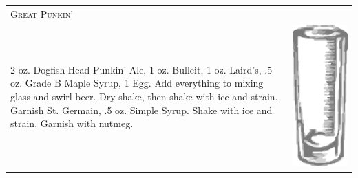 \documentclass{article}
\begin{document}
\begin{multicols}{2}
\begin{tabular}{p{2in} p{0.5in}}
\multicolumn{2}{p{3in}}{\centering\Huge\textsc{Great Punkin'}} \\ 
  \vspace{-0.1in}2 oz. Dogfish Head Punkin' Ale, 1 oz. Bulleit, 1 oz. Laird's, .5 oz. Grade B Maple Syrup, 1 Egg. Add everything to mixing glass and swirl beer. Dry-shake, then shake with ice and  strain. Garnish St. Germain, .5 oz. Simple Syrup.  Shake with ice and strain. Garnish with nutmeg. &
  \vspace{-0.1in} \includegraphics{collins.png}
\end{tabular}


\end{multicols}
\end{document}
